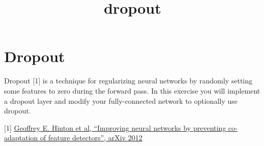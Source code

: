 \documentclass[11pt]{article}
\title{dropout}
\begin{document}
    
    
    \maketitle
    
    

    
    \hypertarget{dropout}{%
\section{Dropout}\label{dropout}}

Dropout {[}1{]} is a technique for regularizing neural networks by
randomly setting some features to zero during the forward pass. In this
exercise you will implement a dropout layer and modify your
fully-connected network to optionally use dropout.

{[}1{]} \href{https://arxiv.org/abs/1207.0580}{Geoffrey E. Hinton et al,
``Improving neural networks by preventing co-adaptation of feature
detectors'', arXiv 2012}
\end{document}
